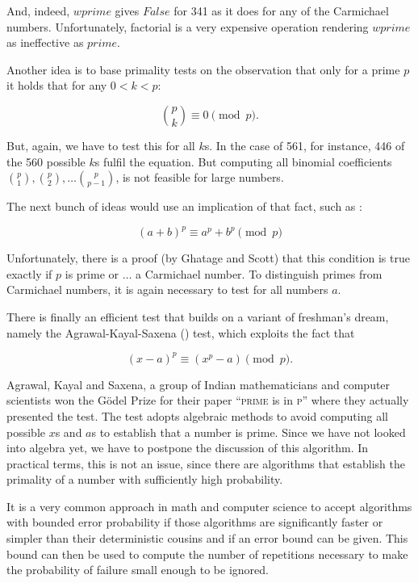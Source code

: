 \documentclass{scrreprt}
\newcommand{\Conid}[1]{\mathit{#1}}
\newcommand{\Varid}[1]{\mathit{#1}}
\begin{document}
And, indeed, \ensuremath{\Varid{wprime}} gives \ensuremath{\Conid{False}} for 341 as
it does for any of the Carmichael numbers.
Unfortunately, factorial is a very expensive operation
rendering \ensuremath{\Varid{wprime}} as ineffective as \ensuremath{\Varid{prime}}.

Another idea is to base primality tests on the observation
that only for a prime $p$ it holds
that for any $0 < k < p$:

\begin{equation}
\binom{p}{k} \equiv 0 \pmod{p}.
\end{equation}

But, again, we have to test this for all $k$s.
In the case of 561, for instance, 446 of the 560 possible $k$s
fulfil the equation.
But computing all binomial coefficients
$\binom{p}{1}, \binom{p}{2}, \dots \binom{p}{p-1}$,
is not feasible for large numbers.

The next bunch of ideas 
would use an implication of that fact,
such as :

\begin{equation}
(a + b)^p \equiv a^p + b^p \pmod{p}
\end{equation}

Unfortunately, there is a proof
(by Ghatage and Scott) that this condition is true
exactly if $p$ is prime or $\dots$ a Carmichael number.
To distinguish primes from Carmichael numbers,
it is again necessary to test for all numbers $a$.

There is finally an efficient test that builds
on a variant of freshman's dream,
namely the Agrawal-Kayal-Saxena () test,
which exploits the fact that

\begin{equation}
(x - a)^p \equiv (x^p - a) \pmod{p}.
\end{equation}

Agrawal, Kayal and Saxena, 
a group of Indian mathematicians and computer scientists
won the Gödel Prize 
for their paper ``\textsc{prime} is in \textsc{p}'' where they
actually presented the  test.
The test adopts algebraic methods to avoid computing
all possible $x$s and $a$s to establish
that a number is prime. 
Since we have not looked into algebra yet,
we have to postpone the discussion of this algorithm.
In practical terms, this is not an issue,
since there are algorithms 
that establish the primality of a number
with sufficiently high probability.

It is a very common approach in math and computer science
to accept algorithms with bounded error probability
if those algorithms are significantly faster
or simpler than their deterministic cousins
and if an error bound can be given.
This bound can then be used
to compute the number of repetitions
necessary to make the probability of failure 
small enough to be ignored.
\end{document}
